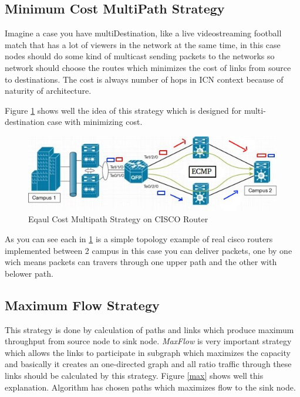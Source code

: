 \subsection{Minimum Cost MultiPath Strategy}
Imagine a case you have multiDestination, like a live videostreaming football match that has a lot of viewers in the network at the same time, in this case nodes should do some kind of multicast sending packets to the networks so network should choose the routes which minimizes the cost of links from source to destinations. The cost is always number of hops in ICN context because of naturity of architecture. 

Figure \ref{balance} shows well the idea of this strategy which is designed for multi-destination case with minimizing cost.

\begin{figure}[H]

\begin{center}

\includegraphics[scale = 0.7]{Pictures/balance.jpg}

\caption{Eqaul Cost Multipath Strategy on CISCO Router} \label{balance} 

\end{center}

\end{figure}

As you can see each in \ref{balance} is a simple topology example of real cisco routers implemented between 2 campus in this case you can deliver packets, one by one wich means packets can travers through one upper path and the other with belower path.


\subsection{Maximum Flow Strategy}
This strategy is done by calculation of paths and links which produce maximum throughput from source node to sink node. \textit{MaxFlow} is very important strategy which allows the links to participate in subgraph which maximizes the capacity and basically it creates an one-directed graph and all ratio traffic through these links should be calculated by this strategy. Figure \ref{max} shows well this explanation. Algorithm has chosen paths which maximizes flow to the sink node.

